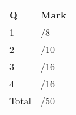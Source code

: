 \documentclass[12pt]{article}
\begin{document}
\begin{table}[hbt]
\begin{center}
\begin{tabular}{|l|l|} \hline
Q&Mark\\
\hline \hline
\cline{1-2} 1 & \enspace\enspace\enspace\enspace\enspace\enspace/8\\
\cline{1-2} 2 & \enspace\enspace\enspace\enspace\enspace\enspace/10\\
\cline{1-2} 3 & \enspace\enspace\enspace\enspace\enspace\enspace/16\\
\cline{1-2} 4 & \enspace\enspace\enspace\enspace\enspace\enspace/16\\
\cline{1-2} Total & \enspace\enspace\enspace\enspace\enspace\enspace/50\\
\hline
\end{tabular}
\end{center}
\end{table}
\newpage
\end{document}
